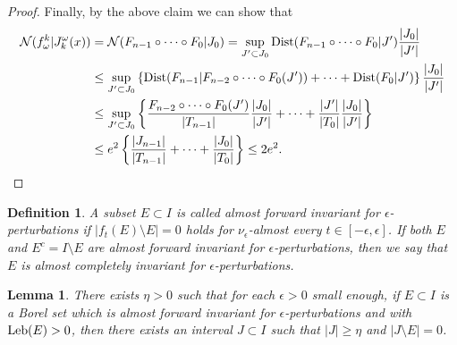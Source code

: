 \documentclass[11pt,oneside]{article}
\newtheorem{definition}{Definition}[section]
\theoremstyle{plain}
\newtheorem{lem}{Lemma}[section]
\numberwithin{equation}{section}
\numberwithin{figure}{section}
\numberwithin{table}{section}
\begin{document}
\begin{proof}
Finally, by the above claim we can show that 
\begin{align*}
\mathcal N(f_{\omega}^k | J_k^{\omega}(x)) & = \mathcal N(F_{n-1} \circ \cdots \circ F_0  | J_0) = \sup_{J' \subset J_0} {\rm Dist} (F_{n-1} \circ \cdots \circ F_0  | J') \frac{|J_0|}{|J'|} \\
& \leq \sup_{J' \subset J_0} \left\{ {\rm Dist} (F_{n-1} | F_{n-2} \circ \cdots \circ F_0 (J')) + \cdots + {\rm Dist} (F_0 | J') \right\} \frac{|J_0|}{|J'|} \\ 
& \leq \sup_{J' \subset J_0} \left\{ \frac{F_{n-2} \circ \cdots \circ F_0 (J')}{|T_{n-1}|}\frac{|J_0|}{|J'|} + \cdots +  \frac{|J'|}{|T_0|} \frac{|J_0|}{|J'|} \right\} \\
& \leq e^2 \left\{ \frac{|J_{n-1}|}{|T_{n-1}|} + \cdots + \frac{|J_0|}{|T_0|} \right\} \leq 2e^2.
\end{align*}


\end{proof}


\iffalse
\begin{definition}
A subset $E \subset I$ is called almost forward invariant for $\epsilon$-perturbations if $|f_t(E) \setminus E| =0$ holds for $\nu_{\epsilon}$-almost every $t \in [-\epsilon, \epsilon]$. If both $E$ and $E^c = I \setminus E$ are almost forward invariant for $\epsilon$-perturbations, then we say that $E$ is almost completely invariant for $\epsilon$-perturbations.

\end{definition}


\begin{lem}\cite{S}
There exists $\eta >0$ such that for each $\epsilon > 0$ small enough, if $E \subset I$ is a Borel set which is almost forward invariant for $\epsilon$-perturbations and with ${\rm Leb}(E) >0$, then there exists an interval $J \subset I$ such that $|J| \geq \eta$ and $|J \setminus E| = 0$. 
\end{lem}
\end{document}
